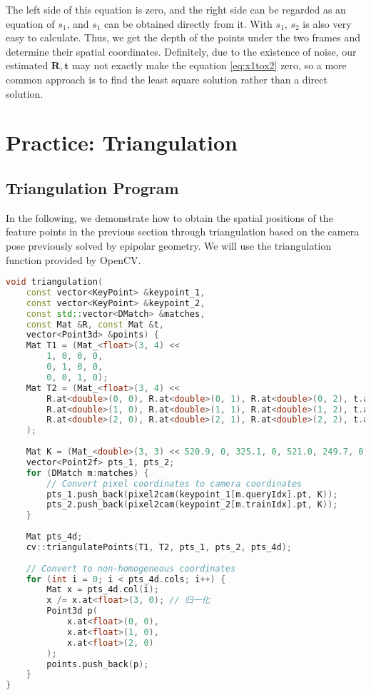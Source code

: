 The left side of this equation is zero, and the right side can be regarded as an equation of $s_1$, and $s_1$ can be obtained directly from it. With $s_1$, $s_2$ is also very easy to calculate. Thus, we get the depth of the points under the two frames and determine their spatial coordinates. Definitely, due to the existence of noise, our estimated $\bm{R}, \bm{t}$ may not exactly make the equation \eqref{eq:x1tox2} zero, so a more common approach is to find the least square solution rather than a direct solution.

\section{Practice: Triangulation}
\subsection{Triangulation Program}
In the following, we demonstrate how to obtain the spatial positions of the feature points in the previous section through triangulation based on the camera pose previously solved by epipolar geometry. We will use the triangulation function provided by OpenCV.

\begin{lstlisting}[language=c++,caption=slambook2/ch7/triangulation.cpp（片段）]
void triangulation(
	const vector<KeyPoint> &keypoint_1,
	const vector<KeyPoint> &keypoint_2,
	const std::vector<DMatch> &matches,
	const Mat &R, const Mat &t,
	vector<Point3d> &points) {
	Mat T1 = (Mat_<float>(3, 4) <<
		1, 0, 0, 0,
		0, 1, 0, 0,
		0, 0, 1, 0);
	Mat T2 = (Mat_<float>(3, 4) <<
		R.at<double>(0, 0), R.at<double>(0, 1), R.at<double>(0, 2), t.at<double>(0, 0),
		R.at<double>(1, 0), R.at<double>(1, 1), R.at<double>(1, 2), t.at<double>(1, 0),
		R.at<double>(2, 0), R.at<double>(2, 1), R.at<double>(2, 2), t.at<double>(2, 0)
	);
	
	Mat K = (Mat_<double>(3, 3) << 520.9, 0, 325.1, 0, 521.0, 249.7, 0, 0, 1);
	vector<Point2f> pts_1, pts_2;
	for (DMatch m:matches) {
		// Convert pixel coordinates to camera coordinates
		pts_1.push_back(pixel2cam(keypoint_1[m.queryIdx].pt, K));
		pts_2.push_back(pixel2cam(keypoint_2[m.trainIdx].pt, K));
	}
	
	Mat pts_4d;
	cv::triangulatePoints(T1, T2, pts_1, pts_2, pts_4d);
	
	// Convert to non-homogeneous coordinates
	for (int i = 0; i < pts_4d.cols; i++) {
		Mat x = pts_4d.col(i);
		x /= x.at<float>(3, 0); // 归一化
		Point3d p(
			x.at<float>(0, 0),
			x.at<float>(1, 0),
			x.at<float>(2, 0)
		);
		points.push_back(p);
	}
}
\end{lstlisting}

